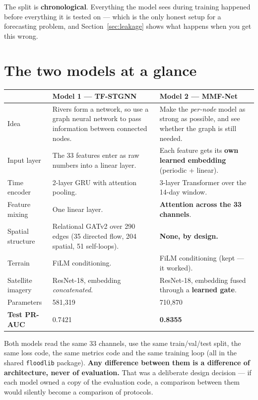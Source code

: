\documentclass[11pt,a4paper]{article}
\newcommand{\good}[1]{\textcolor{green!45!black}{\textbf{#1}}}
\begin{document}
The split is \textbf{chronological}. Everything the model sees during training
happened before everything it is tested on --- which is the only honest setup
for a forecasting problem, and Section~\ref{sec:leakage} shows what happens when
you get this wrong.

\section{The two models at a glance}

\begin{table}[h]
\centering
\small
\begin{tabular}{@{}p{3.1cm}p{5.2cm}p{5.6cm}@{}}
\toprule
& \textbf{Model 1 --- TF-STGNN} & \textbf{Model 2 --- MMF-Net} \\
\midrule
Idea & Rivers form a network, so use a graph neural network to pass information
between connected nodes.
& Make the \emph{per-node} model as strong as possible, and see whether the
graph is still needed. \\[3pt]
Input layer & The 33 features enter as raw numbers into a linear layer.
& Each feature gets its \textbf{own learned embedding} (periodic + linear). \\[3pt]
Time encoder & 2-layer GRU with attention pooling.
& 3-layer Transformer over the 14-day window. \\[3pt]
Feature mixing & One linear layer.
& \textbf{Attention across the 33 channels}. \\[3pt]
Spatial structure & Relational GATv2 over 290 edges (35 directed flow, 204
spatial, 51 self-loops).
& \textbf{None, by design.} \\[3pt]
Terrain & FiLM conditioning. & FiLM conditioning (kept --- it worked). \\[3pt]
Satellite imagery & ResNet-18, embedding \emph{concatenated}.
& ResNet-18, embedding fused through a \textbf{learned gate}. \\[3pt]
Parameters & 581,319 & 710,870 \\[3pt]
\textbf{Test PR-AUC} & 0.7421 & \good{0.8355} \\
\bottomrule
\end{tabular}
\end{table}

\noindent
Both models read the same 33 channels, use the same train/val/test split, the
same loss code, the same metrics code and the same training loop (all in the
shared \texttt{floodlib} package). \textbf{Any difference between them is a
difference of architecture, never of evaluation.} That was a deliberate design
decision --- if each model owned a copy of the evaluation code, a comparison
between them would silently become a comparison of protocols.
\end{document}
